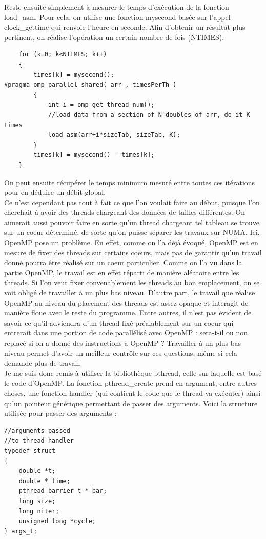 \documentclass{report}
\begin{document}
Reste ensuite simplement à mesurer le temps d'exécution de la fonction load\_asm. Pour cela, on utilise
une fonction mysecond basée sur l'appel clock\_gettime qui renvoie l'heure en seconde. Afin d'obtenir
un résultat plus pertinent, on réalise l'opération un certain nombre de fois (NTIMES).
\begin{lstlisting}
	for (k=0; k<NTIMES; k++)
	{
		times[k] = mysecond();
#pragma omp parallel shared( arr , timesPerTh )
		{
			int i = omp_get_thread_num();
			//load data from a section of N doubles of arr, do it K times
			load_asm(arr+i*sizeTab, sizeTab, K);
		}
		times[k] = mysecond() - times[k];
	}
\end{lstlisting}
On peut ensuite récupérer le temps minimum mesuré entre toutes ces itérations pour en déduire un débit
global. 
\\Ce n'est cependant pas tout à fait ce que l'on voulait faire au début, puisque l'on cherchait à 
avoir des threads chargeant des données de tailles différentes. On aimerait aussi pouvoir faire en sorte
qu'un thread chargeant tel tableau se trouve sur un coeur déterminé, de sorte qu'on puisse séparer les
travaux sur NUMA. Ici, OpenMP pose un problème. En effet, comme on l'a déjà évoqué, OpenMP est en mesure
de fixer des threads sur certains coeurs, mais pas de garantir qu'un travail donné pourra être réalisé
sur un coeur particulier. Comme on l'a vu dans la partie OpenMP, le travail est en effet réparti de 
manière aléatoire entre les threads. Si l'on veut fixer convenablement les threads au bon emplacement,
on se voit obligé de travailler à un plus bas niveau. D'autre part, le travail que réalise OpenMP au 
niveau du placement des threads est assez opaque et interagit de manière floue avec le reste du programme. 
Entre autres, il n'est pas évident de savoir ce qu'il adviendra d'un thread fixé préalablement sur 
un coeur qui entrerait dans une portion de code parallélisé avec OpenMP : sera-t-il ou non replacé si 
on a donné des instructions à OpenMP ? Travailler à un plus bas niveau permet d'avoir un meilleur
contrôle sur ces questions, même si cela demande plus de travail. 
\\Je me suis donc remis à utiliser la bibliothèque pthread, celle sur laquelle est basé le code 
d'OpenMP. La fonction pthread\_create prend en argument, entre autres choses, une fonction 
handler (qui contient le code que le thread va exécuter) ainsi qu'un pointeur générique permettant 
de passer des arguments. Voici la structure utilisée pour passer des arguments : 
\begin{lstlisting}
//arguments passed
//to thread handler
typedef struct 
{
	double *t;
	double * time;
	pthread_barrier_t * bar;
	long size;
	long niter;
	unsigned long *cycle;
} args_t;
\end{lstlisting}
\end{document}
